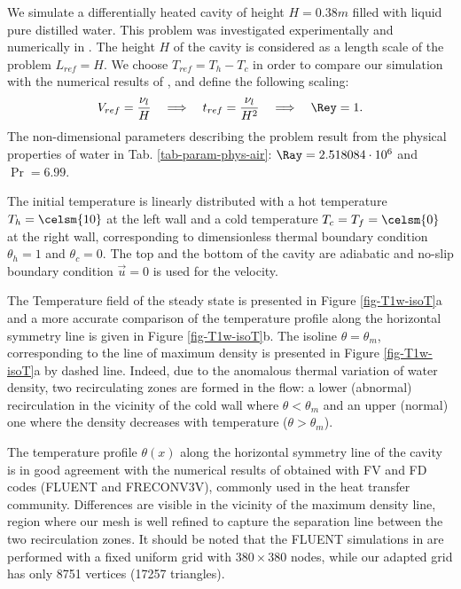 We simulate a differentially heated cavity of height $H = 0.38 m$ filled with liquid pure distilled water.
This problem was investigated experimentally and numerically in \cite{Giangi-2000,Kowalewski-1999,Kowalewski-2003}.
The height $H$ of the cavity is considered as a length scale of the problem $L_{ref} = H$. 
We choose $T_{ref} = T_h - T_c$ in order to compare our simulation with the numerical results of \cite{Kowalewski-2003},
and define the following scaling:
\begin{equation}
   V_{ref} = \frac{\nu_l}{H} 
   \quad \Longrightarrow \quad t_{ref} = \frac{\nu_l}{H^2}
   \quad \Longrightarrow \quad \Rey = 1.
\end{equation} 
The non-dimensional parameters describing the problem result from the physical properties of water in Tab. \ref{tab-param-phys-air}: $\Ray=2.518084\cdot 10^{6}$ and $\Pr=6.99$. %

The initial temperature is linearly distributed with a hot temperature $T_h =\celsm{10}$ at the left wall and a cold temperature $T_c=T_f=\celsm{0}$ at the right wall, corresponding to dimensionless thermal boundary condition $\theta_h = 1$ and 
$\theta_c = 0$. The top and the bottom of the cavity are adiabatic and no-slip boundary condition $\vec u = 0$ is used for the velocity.

The Temperature field of the steady state is presented in Figure \ref{fig-T1w-isoT}a and a more accurate comparison of the temperature profile along the horizontal symmetry line is given in Figure \ref{fig-T1w-isoT}b. 
The isoline $\theta = \theta_m$, corresponding to the line of maximum density is presented in Figure \ref{fig-T1w-isoT}a by dashed line.
Indeed, due to the anomalous thermal variation of water density, two recirculating zones are formed in the flow: a lower (abnormal) recirculation  in the vicinity of the cold wall where $\theta<\theta_m$ and an upper (normal) one where the density decreases with temperature ($\theta>\theta_m$).

The temperature profile $\theta(x)$ along the horizontal symmetry line of the cavity is in good agreement with the numerical results   of \cite{Kowalewski-2003} obtained with FV and FD codes (FLUENT and FRECONV3V), commonly used in the heat transfer community. Differences are visible in the vicinity of the maximum density line, region where our mesh is well refined to capture the separation line between the two recirculation zones. It should be noted that the FLUENT simulations in \cite{Kowalewski-2003} are performed with a fixed uniform grid with $380\times380$ nodes, while our adapted grid has only 8751 vertices (17257 triangles).

